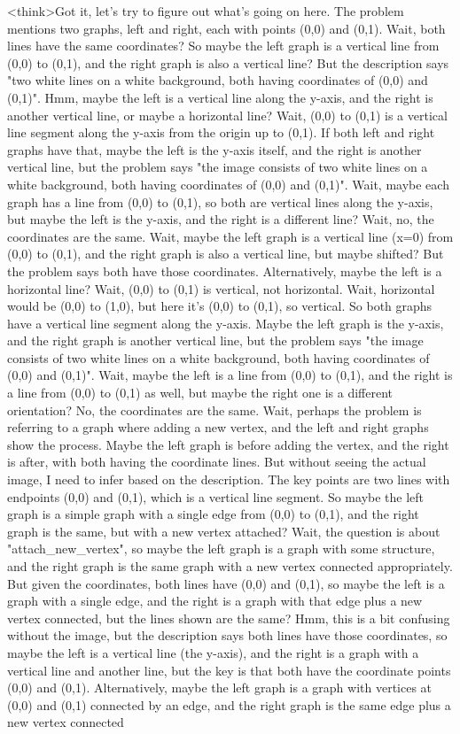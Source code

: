 <think>Got it, let's try to figure out what's going on here. The problem mentions two graphs, left and right, each with points (0,0) and (0,1). Wait, both lines have the same coordinates? So maybe the left graph is a vertical line from (0,0) to (0,1), and the right graph is also a vertical line? But the description says "two white lines on a white background, both having coordinates of (0,0) and (0,1)". Hmm, maybe the left is a vertical line along the y-axis, and the right is another vertical line, or maybe a horizontal line? Wait, (0,0) to (0,1) is a vertical line segment along the y-axis from the origin up to (0,1). If both left and right graphs have that, maybe the left is the y-axis itself, and the right is another vertical line, but the problem says "the image consists of two white lines on a white background, both having coordinates of (0,0) and (0,1)". Wait, maybe each graph has a line from (0,0) to (0,1), so both are vertical lines along the y-axis, but maybe the left is the y-axis, and the right is a different line? Wait, no, the coordinates are the same. Wait, maybe the left graph is a vertical line (x=0) from (0,0) to (0,1), and the right graph is also a vertical line, but maybe shifted? But the problem says both have those coordinates. Alternatively, maybe the left is a horizontal line? Wait, (0,0) to (0,1) is vertical, not horizontal. Wait, horizontal would be (0,0) to (1,0), but here it's (0,0) to (0,1), so vertical. So both graphs have a vertical line segment along the y-axis. Maybe the left graph is the y-axis, and the right graph is another vertical line, but the problem says "the image consists of two white lines on a white background, both having coordinates of (0,0) and (0,1)". Wait, maybe the left is a line from (0,0) to (0,1), and the right is a line from (0,0) to (0,1) as well, but maybe the right one is a different orientation? No, the coordinates are the same. Wait, perhaps the problem is referring to a graph where adding a new vertex, and the left and right graphs show the process. Maybe the left graph is before adding the vertex, and the right is after, with both having the coordinate lines. But without seeing the actual image, I need to infer based on the description. The key points are two lines with endpoints (0,0) and (0,1), which is a vertical line segment. So maybe the left graph is a simple graph with a single edge from (0,0) to (0,1), and the right graph is the same, but with a new vertex attached? Wait, the question is about "attach_new_vertex", so maybe the left graph is a graph with some structure, and the right graph is the same graph with a new vertex connected appropriately. But given the coordinates, both lines have (0,0) and (0,1), so maybe the left is a graph with a single edge, and the right is a graph with that edge plus a new vertex connected, but the lines shown are the same? Hmm, this is a bit confusing without the image, but the description says both lines have those coordinates, so maybe the left is a vertical line (the y-axis), and the right is a graph with a vertical line and another line, but the key is that both have the coordinate points (0,0) and (0,1). Alternatively, maybe the left graph is a graph with vertices at (0,0) and (0,1) connected by an edge, and the right graph is the same edge plus a new vertex connected 